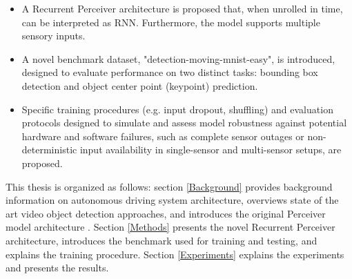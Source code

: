 \begin{itemize}
    \item A Recurrent Perceiver architecture is proposed that, when unrolled in time, can be interpreted as RNN. Furthermore, the model supports multiple sensory inputs.
    \item A novel benchmark dataset, "detection-moving-mnist-easy", is introduced, designed to evaluate performance on two distinct tasks: bounding box detection and object center point (keypoint) prediction.
    \item Specific training procedures (e.g. input dropout, shuffling) and evaluation protocols designed to simulate and assess model robustness against potential hardware and software failures, such as complete sensor outages or non-deterministic input availability in single-sensor and multi-sensor setups, are proposed.
\end{itemize}

This thesis is organized as follows: section \ref{Background} provides background information on autonomous driving system architecture, overviews state of the art video object detection approaches, and introduces the original Perceiver model architecture \cite{jaeglePerceiverGeneralPerception2021}. Section \ref{Methods} presents the novel Recurrent Perceiver architecture, introduces the benchmark used for training and testing, and explains the training procedure. Section \ref{Experiments} explains the experiments and presents the results.


